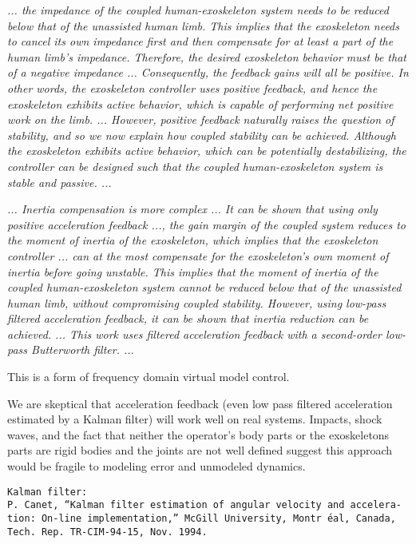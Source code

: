 \documentclass[letterpaper,12pt,fullpage]{article}
\begin{document}
{\it ... the impedance of the coupled human-exoskeleton
system needs to be reduced below that of the unassisted
human limb. This implies that the exoskeleton needs to
cancel its own impedance first and then compensate for
at least a part of the human limb’s impedance. Therefore,
the desired exoskeleton behavior must be that of a negative
impedance ... Consequently,
the feedback gains will all be
positive. In other words, the exoskeleton controller uses
positive feedback, and hence the exoskeleton exhibits active
behavior, which is capable of performing net positive work
on the limb. ...
However, positive feedback naturally raises the question of
stability, and so we now explain how coupled stability can be
achieved. Although the exoskeleton exhibits active behavior,
which can be potentially destabilizing, the controller can be
designed such that the coupled human-exoskeleton system
is stable and passive. ... 
}~\cite{Nagarajan_etal_2015}

{\it
... Inertia compensation is more complex ...
It can be shown that using only positive acceleration
feedback ..., the gain margin of the coupled system
reduces to the moment of inertia of the exoskeleton, which
implies that the exoskeleton controller ... can at the most
compensate for the exoskeleton’s own moment of inertia
before going unstable. This implies that the moment of
inertia of the coupled human-exoskeleton system cannot be
reduced below that of the unassisted human limb, without
compromising coupled stability. However, using low-pass
filtered acceleration feedback, it can be shown that inertia 
reduction can be achieved. ...
This work uses filtered acceleration
feedback with a second-order low-pass Butterworth filter. ...
}~\cite{Nagarajan_etal_2015}

This is a form of frequency domain virtual model control.

We are skeptical that acceleration feedback (even low pass filtered acceleration
estimated by a Kalman filter) will
work well on real systems. Impacts, shock waves, and the fact that neither
the operator's body parts or the exoskeletons parts are rigid bodies and the
joints are not well defined suggest this approach would be fragile to modeling
error and unmodeled dynamics.

\begin{verbatim}
Kalman filter:
P. Canet, “Kalman filter estimation of angular velocity and accelera-
tion: On-line implementation,” McGill University, Montr ́eal, Canada,
Tech. Rep. TR-CIM-94-15, Nov. 1994.
\end{verbatim}
\end{document}
